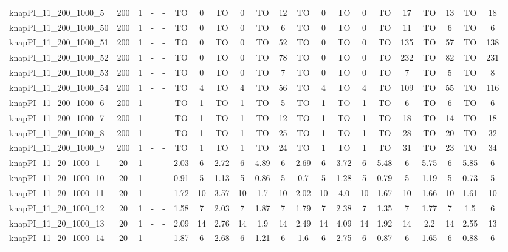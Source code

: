 \begin{sidewaystable}[!ht]
{\begin{tabular}{lcccccccccccccccccccc}
knapPI\_11\_200\_1000\_5 & 200 & 1 &  - &  - & TO & 0 & TO & 0 & TO & 12 & TO & 0 & TO & 0 & TO & 17 & TO & 13 & TO & 18 \\
knapPI\_11\_200\_1000\_50 & 200 & 1 &  - &  - & TO & 0 & TO & 0 & TO & 6 & TO & 0 & TO & 0 & TO & 11 & TO & 6 & TO & 6 \\
knapPI\_11\_200\_1000\_51 & 200 & 1 &  - &  - & TO & 0 & TO & 0 & TO & 52 & TO & 0 & TO & 0 & TO & 135 & TO & 57 & TO & 138 \\
knapPI\_11\_200\_1000\_52 & 200 & 1 &  - &  - & TO & 0 & TO & 0 & TO & 78 & TO & 0 & TO & 0 & TO & 232 & TO & 82 & TO & 231 \\
knapPI\_11\_200\_1000\_53 & 200 & 1 &  - &  - & TO & 0 & TO & 0 & TO & 7 & TO & 0 & TO & 0 & TO & 7 & TO & 5 & TO & 8 \\
knapPI\_11\_200\_1000\_54 & 200 & 1 &  - &  - & TO & 4 & TO & 4 & TO & 56 & TO & 4 & TO & 4 & TO & 109 & TO & 55 & TO & 116 \\
knapPI\_11\_200\_1000\_6 & 200 & 1 &  - &  - & TO & 1 & TO & 1 & TO & 5 & TO & 1 & TO & 1 & TO & 6 & TO & 6 & TO & 6 \\
knapPI\_11\_200\_1000\_7 & 200 & 1 &  - &  - & TO & 1 & TO & 1 & TO & 12 & TO & 1 & TO & 1 & TO & 18 & TO & 14 & TO & 18 \\
knapPI\_11\_200\_1000\_8 & 200 & 1 &  - &  - & TO & 1 & TO & 1 & TO & 25 & TO & 1 & TO & 1 & TO & 28 & TO & 20 & TO & 32 \\
knapPI\_11\_200\_1000\_9 & 200 & 1 &  - &  - & TO & 1 & TO & 1 & TO & 24 & TO & 1 & TO & 1 & TO & 31 & TO & 23 & TO & 34 \\
knapPI\_11\_20\_1000\_1 & 20 & 1 &  - &  - & 2.03 & 6 & 2.72 & 6 & 4.89 & 6 & 2.69 & 6 & 3.72 & 6 & 5.48 & 6 & 5.75 & 6 & 5.85 & 6 \\
knapPI\_11\_20\_1000\_10 & 20 & 1 &  - &  - & 0.91 & 5 & 1.13 & 5 & 0.86 & 5 & 0.7 & 5 & 1.28 & 5 & 0.79 & 5 & 1.19 & 5 & 0.73 & 5 \\
knapPI\_11\_20\_1000\_11 & 20 & 1 &  - &  - & 1.72 & 10 & 3.57 & 10 & 1.7 & 10 & 2.02 & 10 & 4.0 & 10 & 1.67 & 10 & 1.66 & 10 & 1.61 & 10 \\
knapPI\_11\_20\_1000\_12 & 20 & 1 &  - &  - & 1.58 & 7 & 2.03 & 7 & 1.87 & 7 & 1.79 & 7 & 2.38 & 7 & 1.35 & 7 & 1.77 & 7 & 1.5 & 6 \\
knapPI\_11\_20\_1000\_13 & 20 & 1 &  - &  - & 2.09 & 14 & 2.76 & 14 & 1.9 & 14 & 2.49 & 14 & 4.09 & 14 & 1.92 & 14 & 2.2 & 14 & 2.55 & 13 \\
knapPI\_11\_20\_1000\_14 & 20 & 1 &  - &  - & 1.87 & 6 & 2.68 & 6 & 1.21 & 6 & 1.6 & 6 & 2.75 & 6 & 0.87 & 6 & 1.65 & 6 & 0.88 & 6 \\

\end{tabular}}
\end{sidewaystable}
